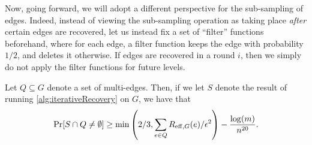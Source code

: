 \documentclass{article}
\begin{document}
Now, going forward, we will adopt a different perspective for the sub-sampling of edges. Indeed, instead of viewing the sub-sampling operation as taking place \emph{after} certain edges are recovered, let us instead fix a set of ``filter'' functions beforehand, where for each edge, a filter function keeps the edge with probability $1/2$, and deletes it otherwise. If edges are recovered in a round $i$, then we simply do not apply the filter functions for future levels.

\begin{claim}\label{clm:ERSumRecovery}
    Let $Q \subseteq G$ denote a set of multi-edges. Then, if we let $S$ denote the result of running \cref{alg:iterativeRecovery} on $G$, we have that 
    \[
    \Pr[S \cap Q \neq \emptyset] \geq \min \left (2/3, \sum_{e \in Q} R_{\mathrm{eff}, G}(e) / \epsilon^2 \right ) - \frac{\log(m)}{n^{20}}. 
    \]
\end{claim}
\end{document}
